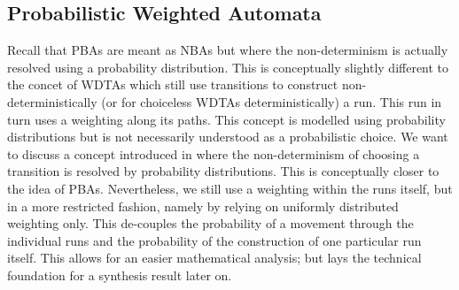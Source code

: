 \subsection{Probabilistic Weighted Automata}
Recall that \acp{PBA} are meant as \acp{NBA} but where the non-determinism is
actually resolved using a probability distribution. This is conceptually 
slightly different to the concet of \acp{WDTA} which still use transitions to
construct non-deterministically (or for choiceless \acp{WDTA} 
deterministically) a run. This run in turn uses a weighting along its paths. 
This concept is modelled using probability distributions but is not necessarily
understood as a probabilistic choice. We want to discuss a concept introduced
in \cite[Chapter 4]{RandAutoInfTrees} where the non-determinism of choosing a
transition is resolved by probability distributions. This is conceptually 
closer to the idea of \acp{PBA}. Nevertheless, we still use a weighting within
the runs itself, but in a more restricted fashion, namely by relying on 
uniformly distributed weighting only. This de-couples the probability of a 
movement through the individual runs and the probability of the construction of 
one particular run itself. This allows for an easier mathematical analysis; but
lays the technical foundation for a synthesis result later on.

